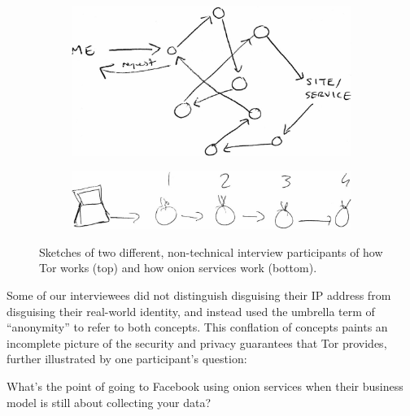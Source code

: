 \begin{figure}[t]
    \centering

    \begin{subfigure}[t]{\linewidth}
        \centering
        \includegraphics[width=0.8\linewidth]{figures/tor-sketch.jpg}
        \label{fig:tor-sketch}
    \end{subfigure}

    \begin{subfigure}[t]{\linewidth}
        \centering
        \includegraphics[width=0.8\linewidth]{figures/os-sketch.jpg}
        \label{fig:os-sketch}
    \end{subfigure}

    \caption{Sketches of two different, non-technical interview participants of
    how Tor works (top) and how onion services work (bottom).}
\end{figure}

Some of our interviewees did not distinguish disguising their IP address from
disguising their real-world identity, and instead used the umbrella term of
``anonymity'' to refer to both concepts.  This conflation of concepts paints an
incomplete picture of the security and privacy guarantees that Tor provides,
further illustrated by one participant's question:

\begin{displayquote}[P07]
What's the point of going to Facebook using onion services when their business
model is still about collecting your data?
\end{displayquote}

